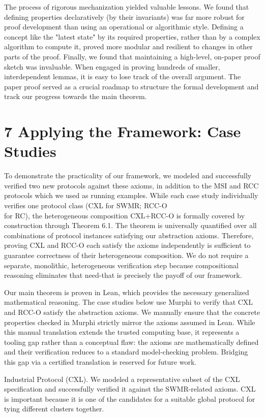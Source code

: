 \documentclass[10pt]{article}
\begin{document}
The process of rigorous mechanization yielded valuable lessons. We found that defining properties declaratively (by their invariants) was far more robust for proof development than using an operational or algorithmic style. Defining a concept like the "latest state" by its required properties, rather than by a complex algorithm to compute it, proved more modular and resilient to changes in other parts of the proof. Finally, we found that maintaining a high-level, on-paper proof sketch was invaluable. When engaged in proving hundreds of smaller, interdependent lemmas, it is easy to lose track of the overall argument. The paper proof served as a crucial roadmap to structure the formal development and track our progress towards the main theorem.

\section*{7 Applying the Framework: Case Studies}
To demonstrate the practicality of our framework, we modeled and successfully verified two new protocols against these axioms, in addition to the MSI and RCC protocols which we used as running examples. While each case study individually verifies one protocol class (CXL for SWMR; RCC-O\\
for RC), the heterogeneous composition CXL+RCC-O is formally covered by construction through Theorem 6.1. The theorem is universally quantified over all combinations of protocol instances satisfying our abstraction axioms. Therefore, proving CXL and RCC-O each satisfy the axioms independently is sufficient to guarantee correctness of their heterogeneous composition. We do not require a separate, monolithic, heterogeneous verification step because compositional reasoning eliminates that need-that is precisely the payoff of our framework.

Our main theorem is proven in Lean, which provides the necessary generalized mathematical reasoning. The case studies below use Murphi to verify that CXL and RCC-O satisfy the abstraction axioms. We manually ensure that the concrete properties checked in Murphi strictly mirror the axioms assumed in Lean. While this manual translation extends the trusted computing base, it represents a tooling gap rather than a conceptual flaw: the axioms are mathematically defined and their verification reduces to a standard model-checking problem. Bridging this gap via a certified translation is reserved for future work.

Industrial Protocol (CXL). We modeled a representative subset of the CXL specification and successfully verified it against the SWMR-related axioms. CXL is important because it is one of the candidates for a suitable global protocol for tying different clusters together.
\end{document}
